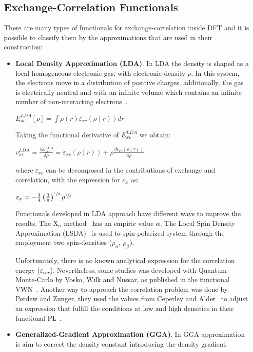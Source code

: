 \subsection{Exchange-Correlation Functionals}

There are many types of functionals for exchange-correlation inside DFT and it
is possible to classify them by the approximations that are used in their
construction:
%
\begin{itemize}
\item \textbf{Local Density Approximation (LDA)}. In LDA the density is shaped
as a local homogeneous electronic gas, with electronic density $\rho$. In this
system, the electrons move in a distribution of positive charges, additionally,
the gas is electrically neutral and with an infinite volume which contains an
infinite number of non-interacting electrons~\cite{Koch2001}.

$E_{xc}^{LDA} [\rho] = \int \rho (r) \varepsilon_{xc}(\rho (r)) dr$

Taking the functional derivative of $E_{xc}^{LDA}$ we obtain:

$v_{xc}^{LDA} = \frac{\delta E_{xc}^{LDA}}{\delta\rho} = \varepsilon_{xc}(\rho (r))
+ \rho \frac{\partial \varepsilon_{xc}(\rho (r))}{\partial\rho}$

where $\varepsilon_{xc}$ can be decomposed in the contributions of exchange and
correlation, with the expression for $\varepsilon_{x}$ as:

$\varepsilon_{x} = -\frac34 \left( \frac{3}{\pi} \right)^{\sfrac13}\rho^{\sfrac13}$ 

Functionals developed in LDA approach have different ways to improve the
results. The X$_{\alpha}$ method~\cite{Slater74} has an empiric value $\alpha$,
The Local Spin Density Approximation (LSDA)~\cite{Slater74} is used to spin
polarized system through the employment two spin-densities ($\rho_\alpha$,
$\rho_\beta$).

Unfortunately, there is no known analytical expression for the correlation
energy ($\varepsilon_{cor}$). Nevertheless, some studies was developed with
Quantum Monte-Carlo by Vosko, Wilk and Nussar, as published in the functional
VWN~\cite{Vosko1980}. Another way to approach the correlation problem was done
by Perdew and Zunger, they used the values from Ceperley and
Alder~\cite{Ceperley1980} to adjust an expression that fulfill the conditions
at low and high densities in their functional PL~\cite{Perdew1981}.


\item \textbf{Generalized-Gradient Approximation (GGA)}.  In \gls{GGA}
approximation is aim to correct the density constant introducing the density
gradient.


\end{itemize}
